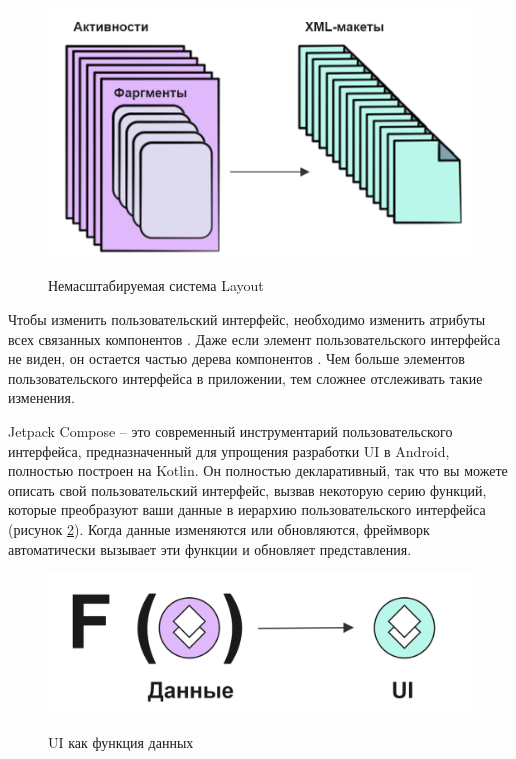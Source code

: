 \begin{figure}[h!]
    \begin{center}
        \includegraphics[width=0.85\hsize]{fig/nonxml.png}\\[2mm]
        \caption{Немасштабируемая система Layout}\label{fig:NonScalableLayoutSystem}
    \end{center}
\end{figure}

Чтобы изменить пользовательский интерфейс, необходимо изменить атрибуты всех связанных компонентов \cite{book:Xml1}. Даже если элемент пользовательского интерфейса не виден, он остается частью дерева компонентов \cite{Kotlin3}. Чем больше элементов пользовательского интерфейса в приложении, тем сложнее отслеживать такие изменения.

Jetpack Compose -- это современный инструментарий пользовательского интерфейса, предназначенный для упрощения разработки UI в Android, полностью построен на Kotlin. Он полностью декларативный, так что вы можете описать свой пользовательский интерфейс, вызвав некоторую серию функций, которые преобразуют ваши данные в иерархию пользовательского интерфейса (рисунок \ref{fig:UIAsDataFunction}). Когда данные изменяются или обновляются, фреймворк автоматически вызывает эти функции и обновляет представления.

\begin{figure}[h!]
    \begin{center}
        \includegraphics[width=0.85\hsize]{fig/fui.png}\\[2mm]
        \caption{UI как функция данных}\label{fig:UIAsDataFunction}
    \end{center}
\end{figure}

